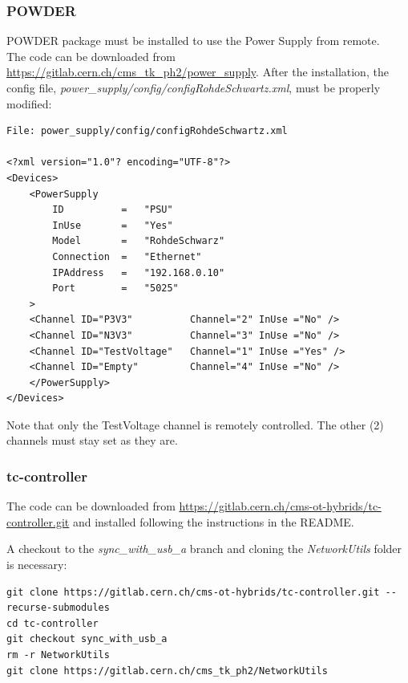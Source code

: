 \documentclass[10pt,a4paper]{article}
\begin{document}
\subsubsection{POWDER}
\label{powder}

POWDER package must be installed to use the Power Supply from remote. \\
The code can be downloaded from \url{https://gitlab.cern.ch/cms_tk_ph2/power_supply}.
After the installation, the config file, \emph{power\_supply/config/configRohdeSchwartz.xml}, must be properly modified:
\begin{framed}
\begin{verbatim}
File: power_supply/config/configRohdeSchwartz.xml

<?xml version="1.0"? encoding="UTF-8"?>
<Devices>
    <PowerSupply
        ID          =   "PSU"
        InUse       =   "Yes"
        Model       =   "RohdeSchwarz"
        Connection  =   "Ethernet"
        IPAddress   =   "192.168.0.10"
        Port        =   "5025"
    >
    <Channel ID="P3V3"          Channel="2" InUse ="No" />
    <Channel ID="N3V3"          Channel="3" InUse ="No" />
    <Channel ID="TestVoltage"   Channel="1" InUse ="Yes" />
    <Channel ID="Empty"         Channel="4" InUse ="No" />
    </PowerSupply>
</Devices>

\end{verbatim}
\end{framed}
Note that only the TestVoltage channel is remotely controlled. The other (2) channels must stay set as they are.

\subsubsection{tc-controller}
\label{tc-controller}

The code can be downloaded from \url{https://gitlab.cern.ch/cms-ot-hybrids/tc-controller.git} and installed following the instructions in the README.

A checkout to the \emph{sync\_with\_usb\_a} branch and cloning the \emph{NetworkUtils} folder is necessary:

\begin{framed}
\begin{verbatim}
git clone https://gitlab.cern.ch/cms-ot-hybrids/tc-controller.git --recurse-submodules
cd tc-controller
git checkout sync_with_usb_a
rm -r NetworkUtils
git clone https://gitlab.cern.ch/cms_tk_ph2/NetworkUtils
\end{verbatim}
\end{framed}
\end{document}
